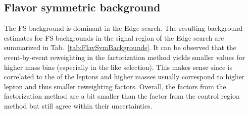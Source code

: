 \subsection*{Flavor symmetric background}\label{sec:fsstrong}
\noindent
\justify
The FS background is dominant in the Edge search.
The resulting background estimates for FS backgrounds in the signal region of the Edge search are summarized in Tab.~\ref{tab:FlavSymBackgrounds}.
It can be observed that the event-by-event reweighting in the factorization method yields smaller \Rsfof values for higher mass bins (especially in the \ttbar like selection).
This makes sense since \mll is correlated to the \pt of the leptons and higher masses usually correspond to higher lepton \pt and thus smaller reweighting factors.
Overall, the \Rsfof factors from the factorization method are a bit smaller than the factor from the control region method but still agree within their uncertainties.
